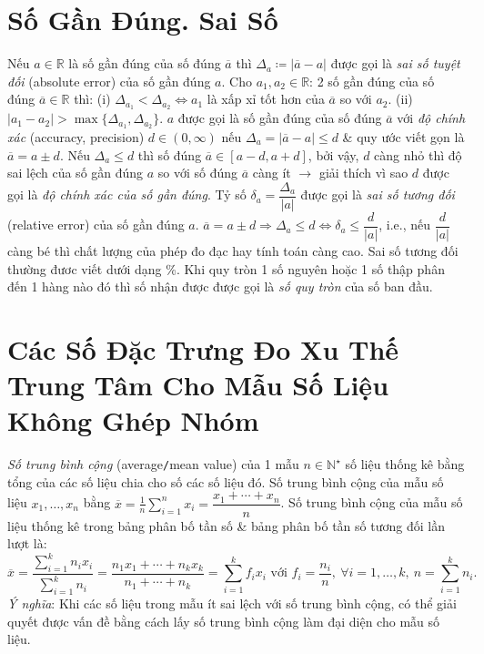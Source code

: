 \documentclass{article}
\begin{document}
\section{Số Gần Đúng. Sai Số}
 Nếu $a\in\mathbb{R}$ là số gần đúng của số đúng $\overline{a}$ thì $\Delta_a\coloneqq|\overline{a} - a|$ được gọi là {\it sai số tuyệt đối} (absolute error) của số gần đúng $a$.  Cho $a_1,a_2\in\mathbb{R}$: 2 số gần đúng của số đúng $\overline{a}\in\mathbb{R}$ thì: (i) $\Delta_{a_1} < \Delta_{a_2}\Leftrightarrow a_1$ là xấp xỉ tốt hơn của $\overline{a}$ so với $a_2$. (ii) $|a_1 - a_2| > \max\{\Delta_{a_1},\Delta_{a_2}\}$.  $a$ được gọi là số gần đúng của số đúng $\overline{a}$ với {\it độ chính xác} (accuracy, precision) $d\in(0,\infty)$ nếu $\Delta_a = |\overline{a} - a|\le d$ \& quy ước viết gọn là $\overline{a} = a\pm d$.  Nếu $\Delta_a\le d$ thì số đúng $\overline{a}\in[a - d,a + d]$, bởi vậy, $d$ càng nhỏ thì độ sai lệch của số gần đúng $a$ so với số đúng $\overline{a}$ càng ít $\to$ giải thích vì sao $d$ được gọi là {\it độ chính xác của số gần đúng}.  Tỷ số $\delta_a = \dfrac{\Delta_a}{|a|}$ được gọi là {\it sai số tương đối} (relative error) của số gần đúng $a$.  $\overline{a} = a\pm d\Rightarrow\Delta_a\le d\Leftrightarrow\delta_a\le\dfrac{d}{|a|}$, i.e., nếu $\dfrac{d}{|a|}$ càng bé thì chất lượng của phép đo đạc hay tính toán càng cao. Sai số tương đối thường đươc viết dưới dạng \%.  Khi quy tròn 1 số nguyên hoặc 1 số thập phân đến 1 hàng nào đó thì số nhận được được gọi là {\it số quy tròn} của số ban đầu.


\section{Các Số Đặc Trưng Đo Xu Thế Trung Tâm Cho Mẫu Số Liệu Không Ghép Nhóm}
 {\it Số trung bình cộng} (average{\tt/}mean value) của 1 mẫu $n\in\mathbb{N}^\star$ số liệu thống kê bằng tổng của các số liệu chia cho số các số liệu đó. Số trung bình cộng của mẫu số liệu $x_1,\ldots,x_n$ bằng $\overline{x} = \frac{1}{n}\sum_{i=1}^n x_i = \dfrac{x_1 + \cdots + x_n}{n}$. Số trung bình cộng của mẫu số liệu thống kê trong bảng phân bố tần số \& bảng phân bố tần số tương đối lần lượt là:
\begin{equation*}
	\overline{x} = \dfrac{\sum_{i=1}^k n_ix_i}{\sum_{i=1}^k n_i} = \dfrac{n_1x_1 + \cdots + n_kx_k}{n_1 + \cdots + n_k} = \sum_{i=1}^k f_ix_i\mbox{ với } f_i = \dfrac{n_i}{n},\ \forall i = 1,\ldots,k,\ n = \sum_{i=1}^k n_i.
\end{equation*}
{\it Ý nghĩa}: Khi các số liệu trong mẫu ít sai lệch với số trung bình cộng, có thể giải quyết được vấn đề bằng cách lấy số trung bình cộng làm đại diện cho mẫu số liệu.  
\end{document}
